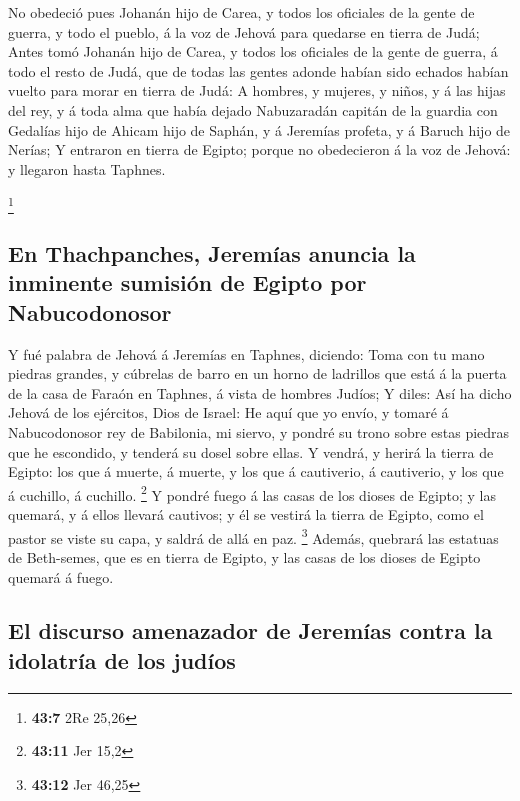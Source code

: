  No obedeció pues Johanán hijo de Carea, y todos los
oficiales de la gente de guerra, y todo el pueblo, á la voz de Jehová
para quedarse en tierra de Judá;  Antes tomó Johanán hijo de
Carea, y todos los oficiales de la gente de guerra, á todo el resto de
Judá, que de todas las gentes adonde habían sido echados habían vuelto
para morar en tierra de Judá:  A hombres, y mujeres, y
niños, y á las hijas del rey, y á toda alma que había dejado Nabuzaradán
capitán de la guardia con Gedalías hijo de Ahicam hijo de Saphán, y á
Jeremías profeta, y á Baruch hijo de Nerías;  Y entraron en
tierra de Egipto; porque no obedecieron á la voz de Jehová: y llegaron
hasta Taphnes.

\footnote{\textbf{43:7} 2Re 25,26}

\hypertarget{en-thachpanches-jeremuxedas-anuncia-la-inminente-sumisiuxf3n-de-egipto-por-nabucodonosor}{%
\subsection{En Thachpanches, Jeremías anuncia la inminente sumisión de
Egipto por
Nabucodonosor}\label{en-thachpanches-jeremuxedas-anuncia-la-inminente-sumisiuxf3n-de-egipto-por-nabucodonosor}}

 Y fué palabra de Jehová á Jeremías en Taphnes, diciendo:
 Toma con tu mano piedras grandes, y cúbrelas de barro en un
horno de ladrillos que está á la puerta de la casa de Faraón en Taphnes,
á vista de hombres Judíos;  Y diles: Así ha dicho Jehová de
los ejércitos, Dios de Israel: He aquí que yo envío, y tomaré á
Nabucodonosor rey de Babilonia, mi siervo, y pondré su trono sobre estas
piedras que he escondido, y tenderá su dosel sobre ellas. 
Y vendrá, y herirá la tierra de Egipto: los que á muerte, á muerte, y
los que á cautiverio, á cautiverio, y los que á cuchillo, á cuchillo.
\footnote{\textbf{43:11} Jer 15,2}  Y pondré fuego á las
casas de los dioses de Egipto; y las quemará, y á ellos llevará
cautivos; y él se vestirá la tierra de Egipto, como el pastor se viste
su capa, y saldrá de allá en paz. \footnote{\textbf{43:12} Jer 46,25}
 Además, quebrará las estatuas de Beth-semes, que es en
tierra de Egipto, y las casas de los dioses de Egipto quemará á fuego.

\hypertarget{el-discurso-amenazador-de-jeremuxedas-contra-la-idolatruxeda-de-los-juduxedos}{%
\subsection{El discurso amenazador de Jeremías contra la idolatría de
los
judíos}\label{el-discurso-amenazador-de-jeremuxedas-contra-la-idolatruxeda-de-los-juduxedos}}

